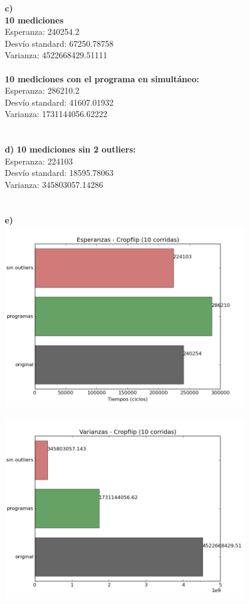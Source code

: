 \documentclass[a4paper]{article}
\begin{document}
\noindent \textbf{c)} \\ \textbf{10 mediciones}\\Esperanza: 240254.2 \\ Desv\'{i}o standard: 67250.78758 \\ Varianza: 4522668429.51111\\ \\
\noindent \textbf{10 mediciones con el programa en simult\'{a}neo:}\\Esperanza: 286210.2 \\ Desv\'{i}o standard: 41607.01932 \\
Varianza: 1731144056.62222\\ \\ \\
\textbf{d)} \textbf{10 mediciones sin 2 outliers:}\\Esperanza: 224103 \\ Desv\'{i}o standard: 18595.78063 \\ Varianza: 345803057.14286\\ \\ \\

\noindent \textbf{e)} \\
\includegraphics[width=300pt]{imagenes/esperanzas.png}

\includegraphics[width=300pt]{imagenes/varianzas.png}
\end{document}

